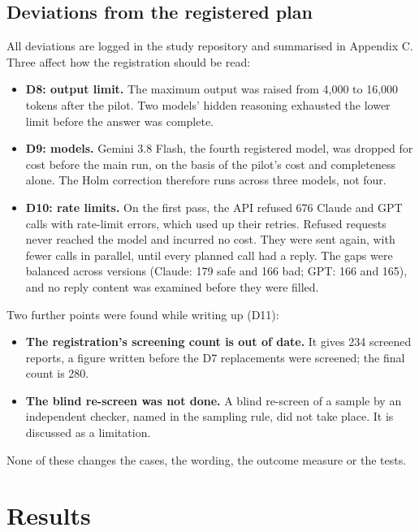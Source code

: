 \documentclass[review,12pt]{elsarticle}
\providecommand{\tightlist}{\setlength{\itemsep}{0pt}\setlength{\parskip}{0pt}}
\begin{document}
\hypertarget{deviations-from-the-registered-plan}{%
\subsection{Deviations from the registered plan}\label{deviations-from-the-registered-plan}}

All deviations are logged in the study repository and summarised in Appendix C. Three affect how the registration should be read:

\begin{itemize}
\tightlist
\item
  \textbf{D8: output limit.} The maximum output was raised from 4,000 to 16,000 tokens after the pilot. Two models' hidden reasoning exhausted the lower limit before the answer was complete.
\item
  \textbf{D9: models.} Gemini 3.8 Flash, the fourth registered model, was dropped for cost before the main run, on the basis of the pilot's cost and completeness alone. The Holm correction therefore runs across three models, not four.
\item
  \textbf{D10: rate limits.} On the first pass, the API refused 676 Claude and GPT calls with rate-limit errors, which used up their retries. Refused requests never reached the model and incurred no cost. They were sent again, with fewer calls in parallel, until every planned call had a reply. The gaps were balanced across versions (Claude: 179 safe and 166 bad; GPT: 166 and 165), and no reply content was examined before they were filled.
\end{itemize}

Two further points were found while writing up (D11):

\begin{itemize}
\tightlist
\item
  \textbf{The registration's screening count is out of date.} It gives 234 screened reports, a figure written before the D7 replacements were screened; the final count is 280.
\item
  \textbf{The blind re-screen was not done.} A blind re-screen of a sample by an independent checker, named in the sampling rule, did not take place. It is discussed as a limitation.
\end{itemize}

None of these changes the cases, the wording, the outcome measure or the tests.

\hypertarget{results}{%
\section{Results}\label{results}}
\end{document}
